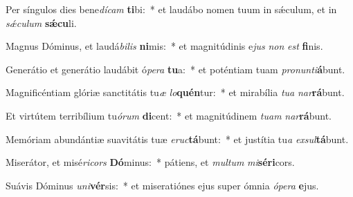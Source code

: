 \item Per síngulos dies bene\textit{dí}\textit{cam} \textbf{ti}bi:~* et laudábo nomen tuum in sǽculum, et in \textit{sǽ}\textit{cu}\textit{lum} \textbf{sǽ}\textbf{cu}li.
\item Magnus Dóminus, et laudá\textit{bi}\textit{lis} \textbf{ni}mis:~* et magnitúdinis e\textit{jus} \textit{non} \textit{est} \textbf{fi}nis.
\item Generátio et generátio laudábit ó\textit{pe}\textit{ra} \textbf{tu}a:~* et poténtiam tuam \textit{pro}\textit{nun}\textit{ti}\textbf{á}bunt.
\item Magnificéntiam glóriæ sanctitátis tu\textit{æ} \textit{lo}\textbf{quén}tur:~* et mirabília \textit{tu}\textit{a} \textit{nar}\textbf{rá}bunt.
\item Et virtútem terribílium tu\textit{ó}\textit{rum} \textbf{di}cent:~* et magnitúdinem \textit{tu}\textit{am} \textit{nar}\textbf{rá}bunt.
\item Memóriam abundántiæ suavitátis tuæ \textit{e}\textit{ruc}\textbf{tá}bunt:~* et justítia tu\textit{a} \textit{ex}\textit{sul}\textbf{tá}bunt.
\item Miserátor, et misé\textit{ri}\textit{cors} \textbf{Dó}minus:~* pátiens, et \textit{mul}\textit{tum} \textit{mi}\textbf{sé}\textbf{ri}cors.
\item Suávis Dóminus \textit{u}\textit{ni}\textbf{vér}sis:~* et miseratiónes ejus super ómnia \textit{ó}\textit{pe}\textit{ra} \textbf{e}jus.
